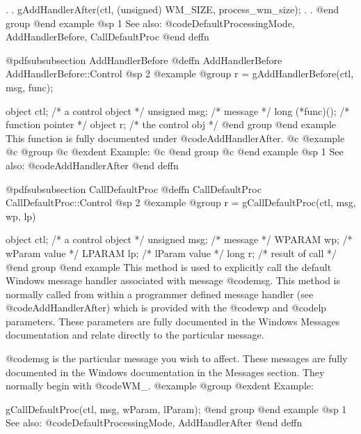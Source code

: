         .
        .
        gAddHandlerAfter(ctl, (unsigned) WM_SIZE, process_wm_size);
        .
        .
@end group
@end example
@sp 1
See also:  @code{DefaultProcessingMode, AddHandlerBefore, CallDefaultProc}
@end deffn






@pdfsubsubsection {AddHandlerBefore}
@deffn {AddHandlerBefore} AddHandlerBefore::Control
@sp 2
@example
@group
r = gAddHandlerBefore(ctl, msg, func);

object   ctl;      /*  a control object  */
unsigned msg;      /*  message           */
long    (*func)(); /*  function pointer  */
object  r;         /*  the control obj   */
@end group
@end example
This function is fully documented under @code{AddHandlerAfter}.
@c @example
@c @group
@c @exdent Example:
@c @end group
@c @end example
@sp 1
See also:  @code{AddHandlerAfter}
@end deffn









@pdfsubsubsection {CallDefaultProc}
@deffn {CallDefaultProc} CallDefaultProc::Control
@sp 2
@example
@group
r = gCallDefaultProc(ctl, msg, wp, lp)

object   ctl;   /*  a control object  */
unsigned msg;   /*  message           */
WPARAM   wp;    /*  wParam value      */
LPARAM   lp;    /*  lParam value      */
long     r;     /*  result of call    */
@end group
@end example
This method is used to explicitly call the default Windows message handler
associated with message @code{msg}.  This method is normally called from
within a programmer defined message handler (see @code{AddHandlerAfter})
which is provided with the @code{wp} and @code{lp} parameters.  These
parameters are fully documented in the Windows Messages documentation
and relate directly to the particular message.

@code{msg} is the particular message you wish to affect.  These messages
are fully documented in the Windows documentation in the Messages
section.  They normally begin with @code{WM_}.
@example
@group
@exdent Example:

gCallDefaultProc(ctl, msg, wParam, lParam);
@end group
@end example
@sp 1
See also:  @code{DefaultProcessingMode, AddHandlerAfter}
@end deffn















